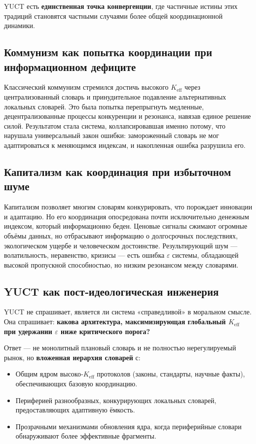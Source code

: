 \documentclass[12pt,a4paper]{article}
\begin{document}
	YUCT есть \textbf{единственная точка конвергенции}, где частичные истины этих традиций становятся частными случаями более общей координационной динамики.
	
	\subsection{Коммунизм как попытка координации при информационном дефиците}
	
	Классический коммунизм стремился достичь высокого \(K_{\mathrm{eff}}\) через централизованный словарь и принудительное подавление альтернативных локальных словарей. Это была попытка перепрыгнуть медленные, децентрализованные процессы конкуренции и резонанса, навязав единое решение силой. Результатом стала система, коллапсировавшая именно потому, что нарушала универсальный закон ошибки: замороженный словарь не мог адаптироваться к меняющимся индексам, и накопленная ошибка разрушила его.
	
	\subsection{Капитализм как координация при избыточном шуме}
	
	Капитализм позволяет многим словарям конкурировать, что порождает инновации и адаптацию. Но его координация опосредована почти исключительно денежным индексом, который информационно беден. Ценовые сигналы сжимают огромные объёмы данных, но отбрасывают информацию о долгосрочных последствиях, экологическом ущербе и человеческом достоинстве. Результирующий шум — волатильность, неравенство, кризисы — есть ошибка \(\varepsilon\) системы, обладающей высокой пропускной способностью, но низким резонансом между словарями.
	
	\subsection{YUCT как пост‑идеологическая инженерия}
	
	YUCT не спрашивает, является ли система «справедливой» в моральном смысле. Она спрашивает: \textbf{какова архитектура, максимизирующая глобальный \(K_{\mathrm{eff}}\) при удержании \(\varepsilon\) ниже критического порога?}
	
	Ответ — не монолитный плановый словарь и не полностью нерегулируемый рынок, но \textbf{вложенная иерархия словарей} с:
	\begin{itemize}[leftmargin=*]
		\item Общим ядром высоко‑\(K_{\mathrm{eff}}\) протоколов (законы, стандарты, научные факты), обеспечивающих базовую координацию.
		\item Периферией разнообразных, конкурирующих локальных словарей, предоставляющих адаптивную ёмкость.
		\item Прозрачными механизмами обновления ядра, когда периферийные словари обнаруживают более эффективные фрагменты.
	\end{itemize}
	
\end{document}
